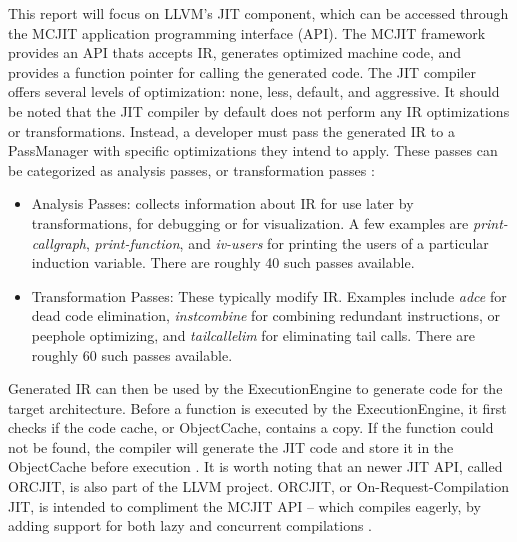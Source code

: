 This report will focus on LLVM's JIT component, which can be accessed through the MCJIT application programming interface (API).
The MCJIT framework provides an API thats accepts IR, generates optimized machine code, and provides a function pointer for calling the generated code.
The JIT compiler offers several levels of optimization: none, less, default, and aggressive.
It should be noted that the JIT compiler by default does not perform any IR optimizations or transformations.
Instead, a developer must pass the generated IR to a PassManager with specific optimizations they intend to apply.
These passes can be categorized as analysis passes, or transformation passes \cite{LLVM_Passes}:
\begin{itemize}
    \item Analysis Passes: collects information about IR for use later by transformations, for debugging or for visualization. 
    A few examples are \textit{print-callgraph}, \textit{print-function}, and \textit{iv-users} for printing the users of a particular induction variable. There are roughly 40 such passes available.
    \item Transformation Passes: These typically modify IR. Examples include \textit{adce} for dead code elimination, \textit{instcombine} for combining redundant instructions, or peephole optimizing, and \textit{tailcallelim} for eliminating tail calls. There are roughly 60 such passes available.
\end{itemize}
Generated IR can then be used by the ExecutionEngine to generate code for the target architecture.
Before a function is executed by the ExecutionEngine, it first checks if the code cache, or ObjectCache, contains a copy.
If the function could not be found, the compiler will generate the JIT code and store it in the ObjectCache before execution \cite{LLVM_MCJIT}.
It is worth noting that an newer JIT API, called ORCJIT, is also part of the LLVM project.
ORCJIT, or On-Request-Compilation JIT, is intended to compliment the MCJIT API -- which compiles eagerly, by adding support for both lazy and concurrent compilations \cite{LLVM_ORCJIT}.